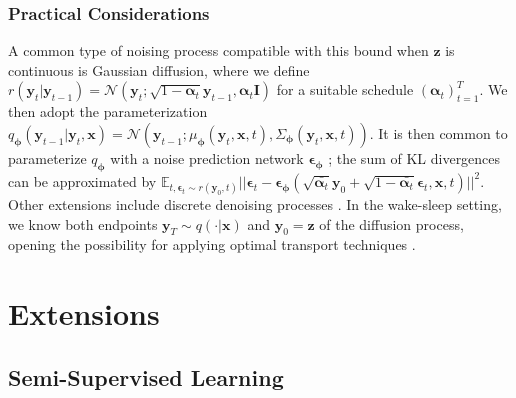 \documentclass[letterpaper]{article} %
\newcommand{\bx}{\mathbf{x}}
\newcommand{\bz}{\mathbf{z}}
\newcommand{\by}{\mathbf{y}}
\newcommand{\bI}{\mathbf{I}}
\let\oldphi\phi
\renewcommand{\phi}{{\boldsymbol \oldphi}}
\let\oldalpha\alpha
\renewcommand{\alpha}{{\boldsymbol \oldalpha}}
\let\oldepsilon\epsilon
\renewcommand{\epsilon}{{\boldsymbol \oldepsilon}}
\begin{document}
\subsubsection{Practical Considerations}

A common type of noising process compatible with this bound when $\bz$ is continuous is Gaussian diffusion, where we define $r(\by_t | \by_{t-1}) = \mathcal{N}(\by_t; \sqrt{1 - \alpha_t} \by_{t-1}, \alpha_t \bI)$ for a suitable schedule $(\alpha_t)_{t=1}^T$. We then adopt the parameterization $q_\phi(\by_{t-1} | \by_t, \bx) = \mathcal{N}(\by_{t-1}; \mu_\phi (\by_t, \bx, t), \Sigma_\phi (\by_t, \bx, t))$. 
It is then common to parameterize $q_\phi$ with a noise prediction network $\epsilon_\phi$ \citep{ho2020denoising}; the sum of KL divergences can be approximated by $\mathbb{E}_{t, \epsilon_t \sim r(\by_0, t)}||\epsilon_t - \epsilon_\phi(\sqrt{\bar{\alpha_t}} \by_0 + \sqrt{1-\bar{\alpha_t}} \epsilon_t, \bx, t)||^2$. Other extensions include discrete denoising processes \citep{austin2021structured,sahoo2024simple,schiff2024simple}. In the wake-sleep setting, we know both endpoints $\by_T \sim q(\cdot|\bx)$ and $\by_0 = \bz$ of the diffusion process, opening the possibility for applying optimal transport techniques \citep{cuturi2013sinkhorn,de2021diffusion}.



\section{Extensions}

\subsection{Semi-Supervised Learning}
\end{document}
